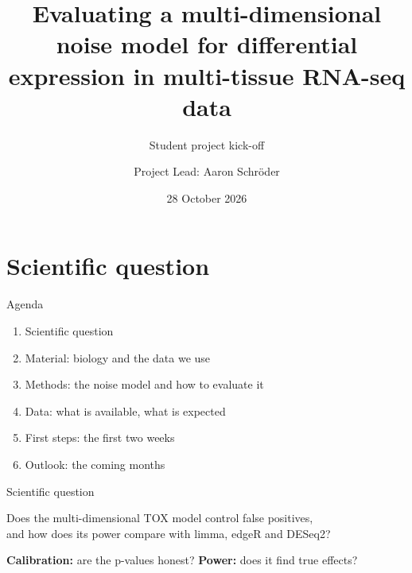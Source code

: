 \documentclass[aspectratio=169]{beamer}
\title{Evaluating a multi-dimensional noise model for differential expression in multi-tissue RNA-seq data}
\subtitle{Student project kick-off}
\author[Aaron Schröder]{Project Lead: Aaron Schröder}
\institute{TH Bingen -- aaron.schroeder@th-bingen.de}
\date{28 October 2026}
\begin{document}
\thbtitleframe

\section{Scientific question}
\begin{frame}{Agenda}
  \begin{enumerate}
    \item Scientific question
    \item Material: biology and the data we use
    \item Methods: the noise model and how to evaluate it
    \item Data: what is available, what is expected
    \item First steps: the first two weeks
    \item Outlook: the coming months
  \end{enumerate}
\end{frame}

\begin{frame}{Scientific question}
  \begin{keyeq}
    Does the multi-dimensional TOX model control false positives,\\
    and how does its power compare with limma, edgeR and DESeq2?
  \end{keyeq}
  \vspace{1em}
  \begin{twocols}
    \textbf{Calibration:} are the p-values honest?
    \colbreak
    \textbf{Power:} does it find true effects?
  \end{twocols}
\end{frame}

\end{document}
